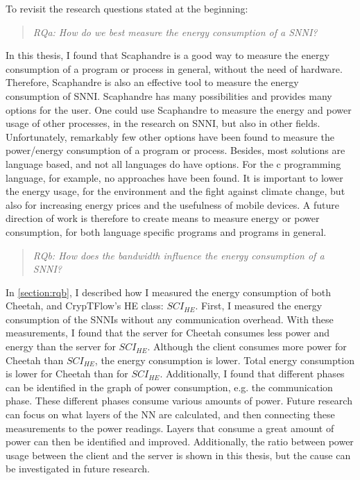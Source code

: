 \documentclass[../thesis.tex]{subfiles}
\begin{document}
To revisit the research questions stated at the beginning:

\begin{quote} \emph{RQa: How do we best measure the energy consumption of a SNNI?} \end{quote}

In this thesis, I found that Scaphandre is a good way to measure the energy consumption of a program or process in general, without the need of hardware. Therefore, Scaphandre is also an effective tool to measure the energy consumption of SNNI. Scaphandre has many possibilities and provides many options for the user. One could use Scaphandre to measure the energy and power usage of other processes, in the research on SNNI, but also in other fields. Unfortunately, remarkably few other options have been found to measure the power/energy consumption of a program or process. Besides, most solutions are language based, and not all languages do have options. For the c programming language, for example, no approaches have been found. It is important to lower the energy usage, for the environment and the fight against climate change, but also for increasing energy prices and the usefulness of mobile devices. A future direction of work is therefore to create means to measure energy or power consumption, for both language specific programs and programs in general.

\begin{quote}
    \emph{RQb: How does the bandwidth influence the energy consumption of a SNNI?}
\end{quote}
In \autoref{section:rqb}, I described how I measured the energy consumption of both Cheetah, and CrypTFlow's HE class: $SCI_{HE}$. First, I measured the energy consumption of the SNNIs without any communication overhead. With these measurements, I found that the server for Cheetah consumes less power and energy than the server for $SCI_{HE}$. Although the client consumes more power for Cheetah than $SCI_{HE}$, the energy consumption is lower. Total energy consumption is lower for Cheetah than for $SCI_{HE}$. Additionally, I found that different phases can be identified in the graph of power consumption, e.g. the communication phase. These different phases consume various amounts of power. Future research can focus on what layers of the NN are calculated, and then connecting these measurements to the power readings. Layers that consume a great amount of power can then be identified and improved. Additionally, the ratio between power usage between the client and the server is shown in this thesis, but the cause can be investigated in future research. 
\end{document}
